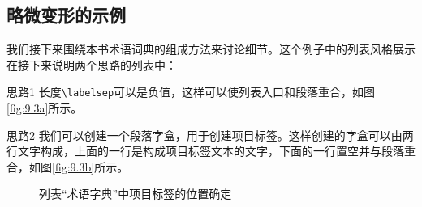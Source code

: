 \subsection{略微变形的示例}

我们接下来围绕本书术语词典的组成方法来讨论细节。这个例子中的列表风格展示在接下来说明两个思路的列表中：

\newcommand{\boiteentreeglossaire}[1]{%
\parbox[b]{\labelwidth}{%
\setlength{\fboxsep}{3pt}%
\setlength{\fboxrule}{.4pt}%
\shadowbox{\sffamily#1}\\\hfill\mbox{}}}

\newenvironment{glossaire}{\begin{list}{}{%
     \setlength{\labelwidth}{.5\textwidth}%
     \setlength{\labelsep}{-.8\labelwidth}%
     \setlength{\itemindent}{\parindent}%
     \setlength{\leftmargin}{25pt}%
     \setlength{\rightmargin}{0pt}%
     \setlength{\itemsep}{.8\baselineskip}%
     \renewcommand{\makelabel}[1]{%
       \boiteentreeglossaire{##1}}}}
{\end{list}}

\begin{glossaire}
    \item[思路1] 长度\verb|\labelsep|可以是负值，这样可以使列表入口和段落重合，如图\ref{fig:9.3a}所示。
    \item[思路2] 我们可以创建一个段落字盒，用于创建项目标签。这样创建的字盒可以由两行文字构成，上面的一行是构成项目标签文本的文字，下面的一行置空并与段落重合，如图\ref{fig:9.3b}所示。
\end{glossaire}

\begin{figure}[ht]
    \begin{center}
        \leavevmode {}
        \hspace{2cm}
      \caption{列表“术语字典”中项目标签的位置确定}
      \label{fig:9.3}
    \end{center}
\end{figure}

